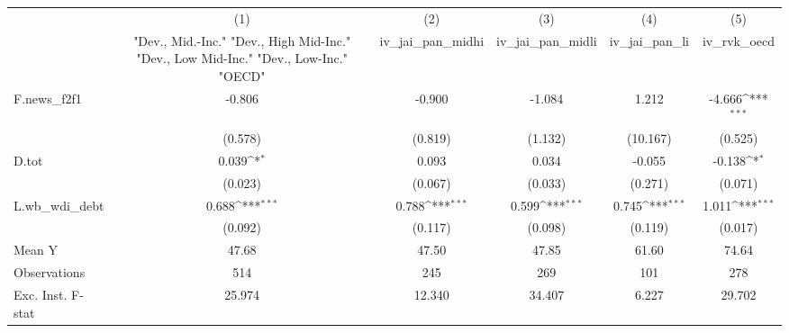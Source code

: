 {
\def\sym#1{\ifmmode^{#1}\else\(^{#1}\)\fi}
\begin{tabular}{l*{5}{c}}
\toprule
            &\multicolumn{1}{c}{(1)}&\multicolumn{1}{c}{(2)}&\multicolumn{1}{c}{(3)}&\multicolumn{1}{c}{(4)}&\multicolumn{1}{c}{(5)}\\
            &\multicolumn{1}{c}{ "Dev., Mid.-Inc." "Dev., High Mid-Inc." "Dev., Low Mid-Inc." "Dev., Low-Inc." "OECD" }&\multicolumn{1}{c}{iv\_jai\_pan\_midhi}&\multicolumn{1}{c}{iv\_jai\_pan\_midli}&\multicolumn{1}{c}{iv\_jai\_pan\_li}&\multicolumn{1}{c}{iv\_rvk\_oecd}\\
\midrule
F.news\_f2f1 &      -0.806         &      -0.900         &      -1.084         &       1.212         &      -4.666\sym{***}\\
            &     (0.578)         &     (0.819)         &     (1.132)         &    (10.167)         &     (0.525)         \\
\addlinespace
D.tot       &       0.039\sym{*}  &       0.093         &       0.034         &      -0.055         &      -0.138\sym{*}  \\
            &     (0.023)         &     (0.067)         &     (0.033)         &     (0.271)         &     (0.071)         \\
\addlinespace
L.wb\_wdi\_debt&       0.688\sym{***}&       0.788\sym{***}&       0.599\sym{***}&       0.745\sym{***}&       1.011\sym{***}\\
            &     (0.092)         &     (0.117)         &     (0.098)         &     (0.119)         &     (0.017)         \\
\midrule
Mean Y      &       47.68         &       47.50         &       47.85         &       61.60         &       74.64         \\
Observations&         514         &         245         &         269         &         101         &         278         \\
Exc. Inst. F-stat&      25.974         &      12.340         &      34.407         &       6.227         &      29.702         \\
\bottomrule
\end{tabular}
}
